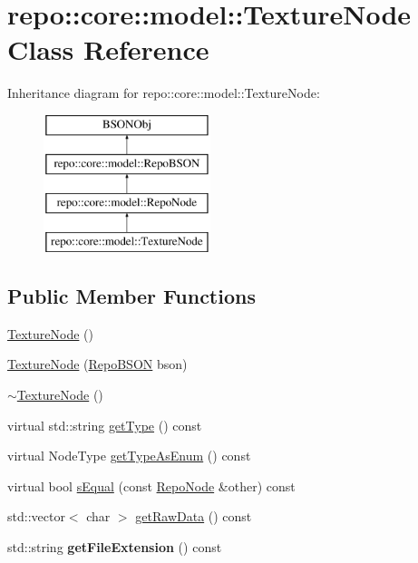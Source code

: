 \hypertarget{classrepo_1_1core_1_1model_1_1_texture_node}{}\section{repo\+:\+:core\+:\+:model\+:\+:Texture\+Node Class Reference}
\label{classrepo_1_1core_1_1model_1_1_texture_node}
Inheritance diagram for repo\+:\+:core\+:\+:model\+:\+:Texture\+Node\+:\begin{figure}[H]
\begin{center}
\leavevmode
\includegraphics[height=4.000000cm]{classrepo_1_1core_1_1model_1_1_texture_node}
\end{center}
\end{figure}
\subsection*{Public Member Functions}
\begin{DoxyCompactItemize}
\item 
\hyperlink{classrepo_1_1core_1_1model_1_1_texture_node_a87faf55e6621f469e898021fa3a11903}{Texture\+Node} ()
\item 
\hyperlink{classrepo_1_1core_1_1model_1_1_texture_node_a895ddcf97500bebe7a14faa74262f5c5}{Texture\+Node} (\hyperlink{classrepo_1_1core_1_1model_1_1_repo_b_s_o_n}{Repo\+B\+S\+O\+N} bson)
\item 
\hyperlink{classrepo_1_1core_1_1model_1_1_texture_node_ab164fe59d9b100109c26387c2bf69553}{$\sim$\+Texture\+Node} ()
\item 
virtual std\+::string \hyperlink{classrepo_1_1core_1_1model_1_1_texture_node_aaae4c87e4e841d8bddc105e29e759d2a}{get\+Type} () const 
\item 
virtual Node\+Type \hyperlink{classrepo_1_1core_1_1model_1_1_texture_node_a78fadf9b11659cf83c24d367b66a6772}{get\+Type\+As\+Enum} () const 
\item 
virtual bool \hyperlink{classrepo_1_1core_1_1model_1_1_texture_node_acc560eb9f51e63bb83d35e859ee4f4c4}{s\+Equal} (const \hyperlink{classrepo_1_1core_1_1model_1_1_repo_node}{Repo\+Node} \&other) const 
\item 
std\+::vector$<$ char $>$ \hyperlink{classrepo_1_1core_1_1model_1_1_texture_node_a06c5329c625a3b1771d03d955ce5643d}{get\+Raw\+Data} () const 
\item 
\hypertarget{classrepo_1_1core_1_1model_1_1_texture_node_a2dc5fa1285a0a647c6c2f95495b6b4fc}{}std\+::string {\bfseries get\+File\+Extension} () const \label{classrepo_1_1core_1_1model_1_1_texture_node_a2dc5fa1285a0a647c6c2f95495b6b4fc}

\end{DoxyCompactItemize}
